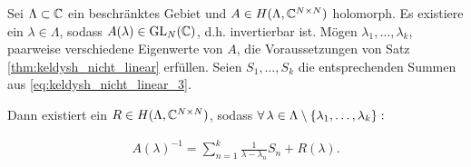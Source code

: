 \begin{corollary} \label{corr:keldysh_multi}

    Sei $\Lambda \subset \mathbb{C}$ ein beschränktes Gebiet und $A \in H(\Lambda, \mathbb{C}^{N \times N})$ holomorph.
    Es existiere ein $\lambda \in \Lambda$, sodass $A(\lambda) \in \operatorname{GL}_N(\mathbb{C})$, d.h. invertierbar ist.
    Mögen $\lambda_1, \dots, \lambda_k$, paarweise verschiedene Eigenwerte von $A$, die Voraussetzungen von Satz \ref{thm:keldysh_nicht_linear} erfüllen.
    Seien $S_1, \dots, S_k$ die entsprechenden Summen aus \eqref{eq:keldysh_nicht_linear_3}.

    Dann existiert ein $R \in H(\Lambda, \mathbb{C}^{N \times N})$, sodass $\forall \, \lambda \in \Lambda \setminus {\left \{ \lambda_1, \dots, \lambda_k \right \}}:$

    \begin{align} \label{keldysh_multi}
        A(\lambda)^{-1}
        =
        \sum_{n=1}^k
            \frac{1}{\lambda - \lambda_n} S_n
        +
        R(\lambda).
    \end{align}

\end{corollary}
